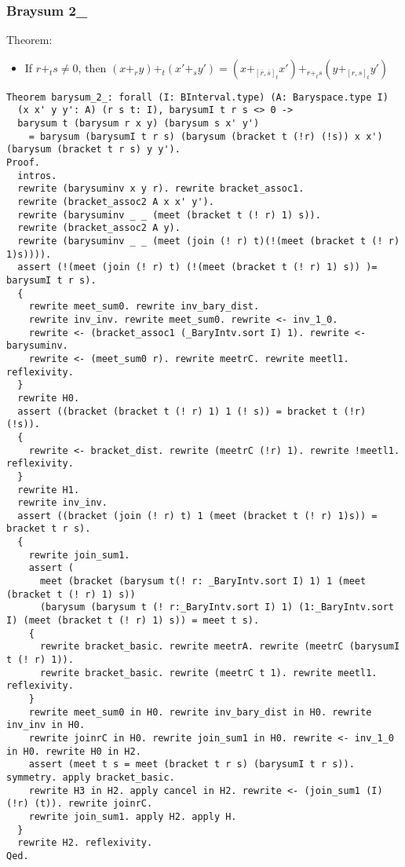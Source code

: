 \documentclass[a4paper,10pt]{article} %
\begin{document}
\subsubsection{Braysum 2\_}
Theorem:
\begin{itemize}
    \item If $r + _ts \neq 0$, then $(x + _ry) + _t(x' + _sy') = (x + _{[\overline{r}, \overline{s}]_t}x') + _{r + _ts}(y + _{[r, s]_t}y')$
\end{itemize}
\begin{lstlisting}
Theorem barysum_2_: forall (I: BInterval.type) (A: Baryspace.type I) 
  (x x' y y': A) (r s t: I), barysumI t r s <> 0 -> 
  barysum t (barysum r x y) (barysum s x' y')
    = barysum (barysumI t r s) (barysum (bracket t (!r) (!s)) x x') (barysum (bracket t r s) y y').
Proof. 
  intros.
  rewrite (barysuminv x y r). rewrite bracket_assoc1.
  rewrite (bracket_assoc2 A x x' y'). 
  rewrite (barysuminv _ _ (meet (bracket t (! r) 1) s)). 
  rewrite (bracket_assoc2 A y).
  rewrite (barysuminv _ _ (meet (join (! r) t)(!(meet (bracket t (! r) 1)s)))).
  assert (!(meet (join (! r) t) (!(meet (bracket t (! r) 1) s)) )= barysumI t r s).
  {
    rewrite meet_sum0. rewrite inv_bary_dist.
    rewrite inv_inv. rewrite meet_sum0. rewrite <- inv_1_0.
    rewrite <- (bracket_assoc1 (_BaryIntv.sort I) 1). rewrite <- barysuminv.
    rewrite <- (meet_sum0 r). rewrite meetrC. rewrite meetl1. reflexivity.
  }
  rewrite H0.
  assert ((bracket (bracket t (! r) 1) 1 (! s)) = bracket t (!r) (!s)).
  {
    rewrite <- bracket_dist. rewrite (meetrC (!r) 1). rewrite !meetl1. reflexivity.
  }
  rewrite H1.
  rewrite inv_inv.
  assert ((bracket (join (! r) t) 1 (meet (bracket t (! r) 1)s)) = bracket t r s).
  {
    rewrite join_sum1. 
    assert (
      meet (bracket (barysum t(! r: _BaryIntv.sort I) 1) 1 (meet (bracket t (! r) 1) s)) 
      (barysum (barysum t (! r:_BaryIntv.sort I) 1) (1:_BaryIntv.sort I) (meet (bracket t (! r) 1) s)) = meet t s).
    {
      rewrite bracket_basic. rewrite meetrA. rewrite (meetrC (barysumI t (! r) 1)). 
      rewrite bracket_basic. rewrite (meetrC t 1). rewrite meetl1. reflexivity.
    } 
    rewrite meet_sum0 in H0. rewrite inv_bary_dist in H0. rewrite inv_inv in H0.
    rewrite joinrC in H0. rewrite join_sum1 in H0. rewrite <- inv_1_0 in H0. rewrite H0 in H2.
    assert (meet t s = meet (bracket t r s) (barysumI t r s)). symmetry. apply bracket_basic.
    rewrite H3 in H2. apply cancel in H2. rewrite <- (join_sum1 (I) (!r) (t)). rewrite joinrC. 
    rewrite join_sum1. apply H2. apply H.
  }
  rewrite H2. reflexivity.
Qed.
\end{lstlisting}
\end{document}
